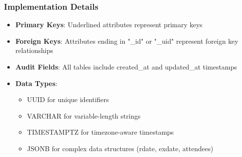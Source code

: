 \documentclass[12pt,a4paper,twoside]{report}
\begin{document}
\subsubsection{Implementation Details}

\begin{itemize}
    \item \textbf{Primary Keys}: Underlined attributes represent primary keys
    \item \textbf{Foreign Keys}: Attributes ending in "\_id" or "\_uid" represent foreign key relationships
    \item \textbf{Audit Fields}: All tables include created\_at and updated\_at timestamps
    \item \textbf{Data Types}:
          \begin{itemize}
              \item UUID for unique identifiers
              \item VARCHAR for variable-length strings
              \item TIMESTAMPTZ for timezone-aware timestamps
              \item JSONB for complex data structures (rdate, exdate, attendees)
          \end{itemize}
\end{itemize}
\end{document}
